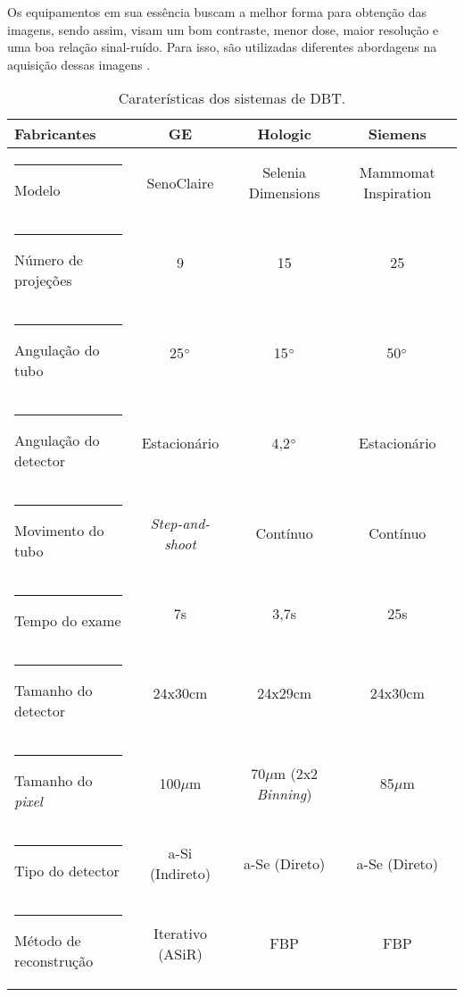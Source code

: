 Os equipamentos em sua essência buscam a melhor forma para obtenção das imagens, sendo assim, visam um bom contraste, menor dose, maior resolução  e uma boa relação sinal-ruído. Para isso, são utilizadas diferentes abordagens na aquisição dessas imagens \cite{vedantham2015digital}. 

\begin{table}[H]
	\centering
	\caption{Caraterísticas dos sistemas  de \acs{DBT}.}
	\label{tab:tabCap2SistemasDBT}
	\begin{tabular}{l|c|c|c}
		\textbf{Fabricantes}                                       &        \textbf{\acs{GE}}        &                 \textbf{Hologic}                 &   \textbf{Siemens}   \\
		[5pt]
		\hline
		\hline
		\rule[-0.5ex]{-3pt}{1ex}
		Modelo &    SenoClaire{\footnotesize\texttrademark}    & Selenia\textsuperscript{\textregistered} Dimensions\textsuperscript{\textregistered} & Mammomat Inspiration \\ \hline
		\rule[-0.5ex]{-3pt}{1ex}
		Número de projeções              &                9                &                        15                        &          25          \\ \hline
		\rule[-0.5ex]{-3pt}{1ex}
		Angulação do tubo                &           25$\degree$           &                   15$\degree$                    &     50$\degree$      \\ \hline
		\rule[-0.5ex]{-3pt}{1ex}
		Angulação do detector            &          Estacionário           &                   4,2$\degree$                   &     Estacionário     \\ \hline
		\rule[-0.5ex]{-3pt}{1ex}
		Movimento do tubo                &     \textit{Step-and-shoot}     &                     Contínuo                     &       Contínuo       \\ \hline
		\rule[-0.5ex]{-3pt}{1ex}
		Tempo do exame                   &               7s                &                       3,7s                       &         25s          \\ \hline
		\rule[-0.5ex]{-3pt}{1ex}
		Tamanho do detector              &             24x30cm             &                     24x29cm                      &       24x30cm        \\ \hline
		\rule[-0.5ex]{-3pt}{1ex}
		Tamanho do \textit{pixel}        &            100$\mu$m            &         70$\mu$m (2x2 \textit{Binning})          &       85$\mu$m       \\ \hline
		\rule[-0.5ex]{-3pt}{1ex}
		Tipo do detector                 &         \acs{a-Si} (Indireto)         &                  \acs{a-Se} (Direto)                   &    \acs{a-Se} (Direto)     \\ \hline
		\rule[-0.5ex]{-3pt}{1ex}
		Método de reconstrução           & Iterativo (ASiR\textsuperscript{\textregistered}) &                    \acs{FBP}                     &      \acs{FBP}       \\ \hline
	\end{tabular}
	\vspace{2ex}
\end{table}


 
    

